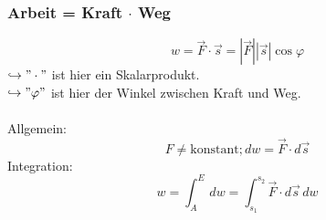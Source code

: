 \documentclass[a4paper, fleqn]{article}
\begin{document}
\subsubsection{Arbeit = Kraft $\cdot$ Weg}
\begin{equation*}
    w = \vec{F} \cdot \vec{s} = \left\lvert \vec{F} \right\rvert \left\lvert \vec{s} \right\rvert \cos \varphi
\end{equation*}
$\hookrightarrow "\cdot"$ ist hier ein Skalarprodukt.\\
$\hookrightarrow "\varphi"$ ist hier der Winkel zwischen Kraft und Weg.\\\\
Allgemein:
\begin{equation*}
    F \neq \mathrm{konstant}; dw = \vec{F} \cdot d\vec{s}
\end{equation*}
Integration:
\begin{equation*}
    w = \int_{A}^{E}  \,dw = \int_{s_1}^{s_2}  \vec{F}\cdot d\vec{s}\,dw
\end{equation*}
\end{document}

